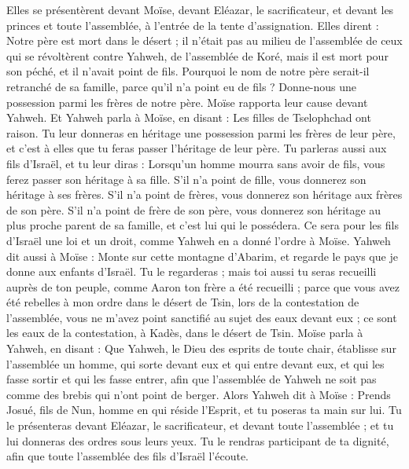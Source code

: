 \begin{multicols}{2}
Elles se présentèrent devant Moïse, devant Eléazar, le sacrificateur, et devant les princes et toute l'assemblée, à l'entrée de la tente d'assignation. Elles dirent :
Notre père est mort dans le désert ; il n’était pas au milieu de l’assemblée de ceux qui se révoltèrent contre Yahweh, de l'assemblée de Koré, mais il est mort pour son péché, et il n'avait point de fils.
Pourquoi le nom de notre père serait-il retranché de sa famille, parce qu'il n'a point eu de fils ? Donne-nous une possession parmi les frères de notre père.
Moïse rapporta leur cause devant Yahweh.
Et Yahweh parla à Moïse, en disant :
Les filles de Tselophchad ont raison. Tu leur donneras en héritage une possession parmi les frères de leur père, et c’est à elles que tu feras passer l'héritage de leur père.
Tu parleras aussi aux fils d'Israël, et tu leur diras : Lorsqu’un homme mourra sans avoir de fils, vous ferez passer son héritage à sa fille.
S'il n'a point de fille, vous donnerez son héritage à ses frères.
S'il n'a point de frères, vous donnerez son héritage aux frères de son père.
S’il n’a point de frère de son père, vous donnerez son héritage au plus proche parent de sa famille, et c’est lui qui le possédera. Ce sera pour les fils d'Israël une loi et un droit, comme Yahweh en a donné l’ordre à Moïse.
Yahweh dit aussi à Moïse : Monte sur cette montagne d'Abarim, et regarde le pays que je donne aux enfants d'Israël.
Tu le regarderas ; mais toi aussi tu seras recueilli auprès de ton peuple, comme Aaron ton frère a été recueilli ;
parce que vous avez été rebelles à mon ordre dans le désert de Tsin, lors de la contestation de l'assemblée, vous ne m'avez point sanctifié au sujet des eaux devant eux ; ce sont les eaux de la contestation, à Kadès, dans le désert de Tsin.
Moïse parla à Yahweh, en disant :
Que Yahweh, le Dieu des esprits de toute chair, établisse sur l'assemblée un homme,
qui sorte devant eux et qui entre devant eux, et qui les fasse sortir et qui les fasse entrer, afin que l'assemblée de Yahweh ne soit pas comme des brebis qui n'ont point de berger.
Alors Yahweh dit à Moïse : Prends Josué, fils de Nun, homme en qui réside l'Esprit, et tu poseras ta main sur lui.
Tu le présenteras devant Eléazar, le sacrificateur, et devant toute l'assemblée ; et tu lui donneras des ordres sous leurs yeux.
Tu le rendras participant de ta dignité, afin que toute l'assemblée des fils d'Israël l'écoute.

\end{multicols}
